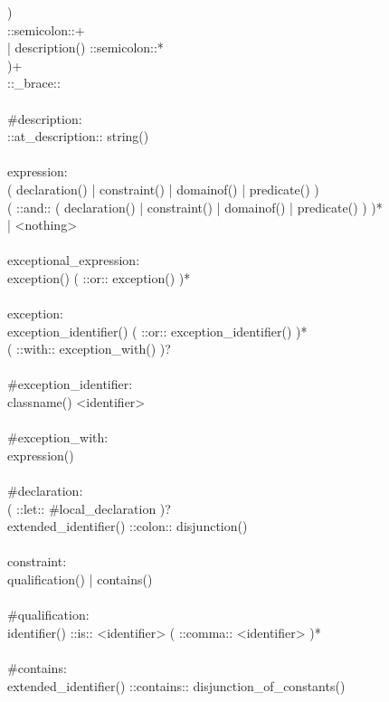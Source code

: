 \begin{bigbigpre}
        ) \\
        ::semicolon::+ \\
      | description() ::semicolon::* \\
    )+ \\
    ::_brace:: \\
 \\
#description: \\
    ::at_description:: string() \\
 \\
expression: \\
              ( declaration() | constraint() | domainof() | predicate() ) \\
    ( ::and:: ( declaration() | constraint() | domainof() | predicate() ) )* \\
  | <nothing> \\
 \\
exceptional_expression: \\
    exception() ( ::or:: exception() )* \\
 \\
exception: \\
    exception_identifier() ( ::or:: exception_identifier() )* \\
    ( ::with:: exception_with() )? \\
 \\
#exception_identifier: \\
    classname() <identifier> \\
 \\
#exception_with: \\
    expression() \\
 \\
#declaration: \\
    ( ::let:: #local_declaration )? \\
    extended_identifier() ::colon:: disjunction() \\
 \\
constraint: \\
    qualification() | contains() \\
 \\
#qualification: \\
    identifier() ::is:: <identifier> ( ::comma:: <identifier> )* \\
 \\
#contains: \\
    extended_identifier() ::contains:: disjunction_of_constants() \\
 \\

\end{bigbigpre}
